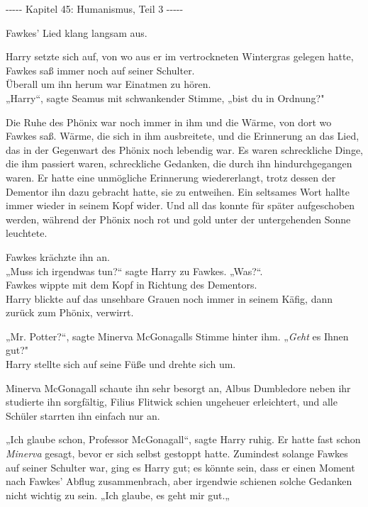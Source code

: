 

\hypertarget{humanismus-teil-3}{%

-\/-\/-\/-\/- Kapitel 45: Humanismus, Teil 3 -\/-\/-\/-\/-

Fawkes' Lied klang langsam aus.

Harry setzte sich auf, von wo aus er im vertrockneten Wintergras gelegen hatte, Fawkes saß immer noch auf seiner Schulter.\\ Überall um ihn herum war Einatmen zu hören.\\ „Harry“, sagte Seamus mit schwankender Stimme, „bist du in Ordnung?"

Die Ruhe des Phönix war noch immer in ihm und die Wärme, von dort wo Fawkes saß. Wärme, die sich in ihm ausbreitete, und die Erinnerung an das Lied, das in der Gegenwart des Phönix noch lebendig war. Es waren schreckliche Dinge, die ihm passiert waren, schreckliche Gedanken, die durch ihn hindurchgegangen waren. Er hatte eine unmögliche Erinnerung wiedererlangt, trotz dessen der Dementor ihn dazu gebracht hatte, sie zu entweihen. Ein seltsames Wort hallte immer wieder in seinem Kopf wider. Und all das konnte für später aufgeschoben werden, während der Phönix noch rot und gold unter der untergehenden Sonne leuchtete.

Fawkes krächzte ihn an.\\ „Muss ich irgendwas tun?“ sagte Harry zu Fawkes. „Was?“.\\ Fawkes wippte mit dem Kopf in Richtung des Dementors.\\ Harry blickte auf das unsehbare Grauen noch immer in seinem Käfig, dann zurück zum Phönix, verwirrt.

„Mr. Potter?“, sagte Minerva McGonagalls Stimme hinter ihm. „\emph{Geht} es Ihnen gut?"\\ Harry stellte sich auf seine Füße und drehte sich um.

Minerva McGonagall schaute ihn sehr besorgt an, Albus Dumbledore neben ihr studierte ihn sorgfältig, Filius Flitwick schien ungeheuer erleichtert, und alle Schüler starrten ihn einfach nur an.

„Ich glaube schon, Professor McGonagall“, sagte Harry ruhig. Er hatte fast schon \emph{Minerva} gesagt, bevor er sich selbst gestoppt hatte. Zumindest solange Fawkes auf seiner Schulter war, ging es Harry gut; es könnte sein, dass er einen Moment nach Fawkes' Abflug zusammenbrach, aber irgendwie schienen solche Gedanken nicht wichtig zu sein. „Ich glaube, es geht mir gut.„

}
